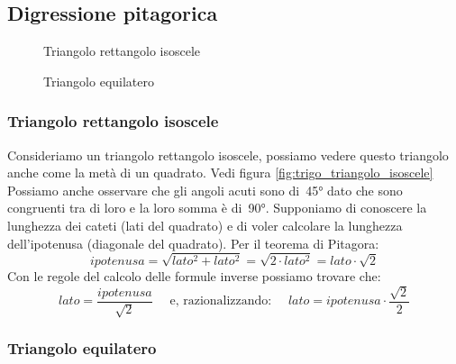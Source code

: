 \newpage %

\subsection{Digressione pitagorica}

 \begin{figure}[!h]
 \begin{minipage}[t]{.45\textwidth}
\begin{inaccessibleblock}
\centering
 
 \caption{Triangolo rettangolo isoscele}
 \label{fig:trigo_triangolo_isoscele}
\end{inaccessibleblock}
 \end{minipage}
 \begin{minipage}[t]{.45\textwidth}
\begin{inaccessibleblock}
\centering
 
 \caption{Triangolo equilatero}
 \label{fig:trigo_equilatero}
\end{inaccessibleblock}
 \end{minipage}
\end{figure}
\vspace{-24pt}

\subsubsection{Triangolo rettangolo isoscele}

Consideriamo un triangolo rettangolo isoscele, possiamo vedere questo 
triangolo anche come la metà di un quadrato. 
Vedi figura \ref{fig:trigo_triangolo_isoscele}
Possiamo anche osservare che gli angoli acuti sono di~45° dato che sono 
congruenti tra di loro e la loro somma è di~90°.
Supponiamo di conoscere la lunghezza dei cateti (lati del quadrato) e di voler 
calcolare la lunghezza dell'ipotenusa (diagonale del quadrato).
Per il teorema di Pitagora:
\[ipotenusa = \sqrt{lato^2 +lato^2} = 
              \sqrt{2 \cdot lato^2} = lato \cdot \sqrt{2}\]
Con le regole del calcolo delle formule inverse possiamo trovare che:
\[lato = \frac{ipotenusa}{\sqrt{2}} \quad \text{ e, razionalizzando: } \quad 
  lato = ipotenusa \cdot \frac{\sqrt{2}}{2}\]
\subsubsection{Triangolo equilatero}

